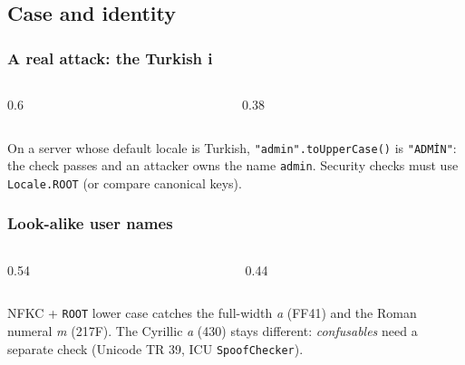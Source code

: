 \documentclass[aspectratio=169,10pt,compress]{beamer}
\begin{document}

\subsection[Case]{Case and identity}




\begin{frame}[t,fragile] \frametitle{A real attack: the Turkish i}
  \begin{columns}[T]
    \begin{column}{0.6\textwidth}
    \end{column}
    \begin{column}{0.38\textwidth}
    \end{column}
  \end{columns}

  \vspace{0.1em}
  \small On a server whose default locale is Turkish, \texttt{"admin".toUpperCase()} is \texttt{"ADMİN"}: the check passes and an
  attacker owns the name \texttt{admin}. Security checks must use \texttt{Locale.ROOT} (or compare canonical keys).
\end{frame}




\begin{frame}[t,fragile] \frametitle{Look-alike user names}
  \begin{columns}[T]
    \begin{column}{0.54\textwidth}
    \end{column}
    \begin{column}{0.44\textwidth}
    \end{column}
  \end{columns}

  \vspace{0.1em}
  \small
  NFKC + \texttt{ROOT} lower case catches the full-width \emph{a} (FF41) and the Roman numeral \emph{m} (217F).
  The Cyrillic \emph{a} (430) stays different: \emph{confusables} need a separate check (Unicode TR 39, ICU \texttt{SpoofChecker}).
\end{frame}
\end{document}
